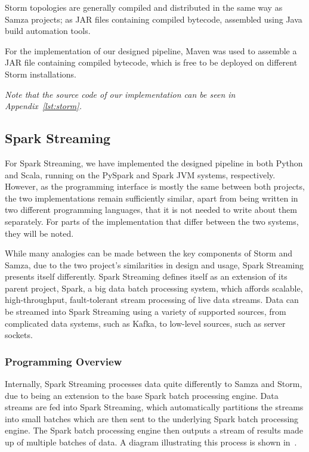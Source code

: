 Storm topologies are generally compiled and distributed in the same way as Samza projects; as JAR files containing compiled
bytecode, assembled using Java build automation tools.

For the implementation of our designed pipeline, Maven was used to assemble a JAR file containing compiled bytecode, which
is free to be deployed on different Storm installations.

\textit{Note that the source code of our implementation can be seen in Appendix~\ref{lst:storm}.}



\subsection{Spark Streaming} %
\label{ssub:impl_spark_streaming}

For Spark Streaming, we have implemented the designed pipeline in both Python and Scala, running on the PySpark and Spark
JVM systems, respectively. However, as the programming interface is mostly the same between both projects, the two
implementations remain sufficiently similar, apart from being written in two different programming languages, that it is
not needed to write about them separately. For parts of the implementation that differ between the two systems, they
will be noted.

While many analogies can be made between the key components of Storm and Samza, due to the two project's similarities in design and
usage, Spark Streaming presents itself differently. Spark Streaming defines itself as an extension of its parent project,
Spark, a big data batch processing system, which affords scalable, high-throughput, fault-tolerant stream processing of
live data streams. Data can be streamed into Spark Streaming using a variety of supported sources, from complicated data
systems, such as Kafka, to low-level sources, such as server sockets.

\subsubsection{Programming Overview}

Internally, Spark Streaming processes data quite differently to Samza and Storm, due to being an extension to the base
Spark batch processing engine. Data streams are fed into Spark Streaming, which automatically partitions the streams into
small batches which are then sent to the underlying Spark batch processing engine. The Spark batch processing engine then
outputs a stream of results made up of multiple batches of data. A diagram illustrating this process is shown in~.

